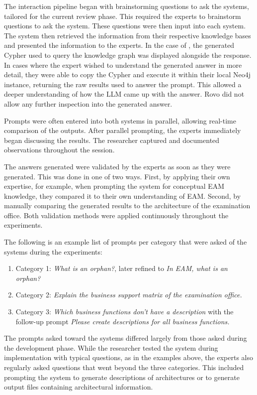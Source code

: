 The interaction pipeline began with brainstorming questions to ask the systems, tailored for the current review phase. This required the experts to brainstorm questions to ask the system. These questions were then input into each system. The system then retrieved the information from their respective knowledge bases and presented the information to the experts. In the case of \prototype{}, the generated Cypher used to query the knowledge graph was displayed alongside the response. In cases where the expert wished to understand the generated answer in more detail, they were able to copy the Cypher and execute it within their local Neo4j instance, returning the raw results used to answer the prompt. This allowed a deeper understanding of how the LLM came up with the answer. Rovo did not allow any further inspection into the generated answer.

Prompts were often entered into both systems in parallel, allowing real-time comparison of the outputs. After parallel prompting, the experts immediately began discussing the results. The researcher captured and documented observations throughout the session.

The answers generated were validated by the experts as soon as they were generated. This was done in one of two ways. First, by applying their own expertise, for example, when prompting the system for conceptual EAM knowledge, they compared it to their own understanding of EAM. Second, by manually comparing the generated results to the architecture of the examination office. Both validation methods were applied continuously throughout the experiments.

The following is an example list of prompts per category that were asked of the systems during the experiments:
\begin{enumerate}
	\item Category 1: \textit{What is an orphan?}, later refined to \textit{In EAM, what is an orphan?}
	\item Category 2: \textit{Explain the business support matrix of the examination office.}
	\item Category 3: \textit{Which business functions don't have a description} with the follow-up prompt \textit{Please create descriptions for all business functions.}
\end{enumerate}

The prompts asked toward the systems differed largely from those asked during the development phase. While the researcher tested the system during implementation with typical questions, as in the examples above, the experts also regularly asked questions that went beyond the three categories. This included prompting the system to generate descriptions of architectures or to generate output files containing architectural information.

